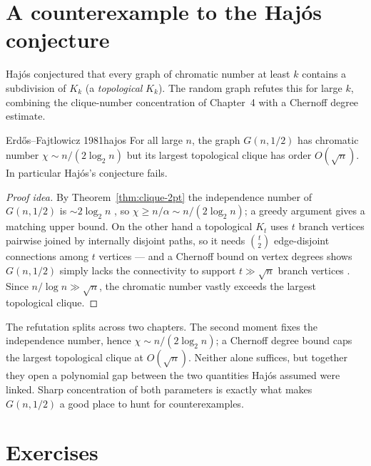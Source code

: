 \section{A counterexample to the Haj\'os conjecture}

Haj\'os conjectured that every graph of chromatic number at least $k$ contains a
subdivision of $K_k$ (a \emph{topological} $K_k$). The random graph refutes this
for large $k$, combining the clique-number concentration of Chapter~4 with a
Chernoff degree estimate.

\begin{theorem}{Erd\H{o}s--Fajtlowicz 1981}{hajos}
For all large $n$, the graph $G(n,1/2)$ has chromatic number
$\chi\sim n/(2\log_2 n)$ but its largest topological clique has order
$O(\sqrt n)$. In particular Haj\'os's conjecture fails.
\end{theorem}

\begin{proof}[Proof idea]
By Theorem~\ref{thm:clique-2pt} the independence number of $G(n,1/2)$ is
$\sim2\log_2 n$ \whp, so $\chi\ge n/\alpha\sim n/(2\log_2 n)$; a greedy argument
gives a matching upper bound. On the other hand a topological $K_t$ uses $t$
branch vertices pairwise joined by internally disjoint paths, so it needs
$\binom t2$ edge-disjoint connections among $t$ vertices --- and a Chernoff bound
on vertex degrees shows $G(n,1/2)$ simply lacks the connectivity to support
$t\gg\sqrt n$ branch vertices \whp. Since $n/\log n\gg\sqrt n$, the chromatic
number vastly exceeds the largest topological clique.
\end{proof}

\begin{insight}
The refutation splits across two chapters. The second moment fixes the
independence number, hence $\chi\sim n/(2\log_2 n)$; a Chernoff degree bound
caps the largest topological clique at $O(\sqrt n)$. Neither alone suffices, but
together they open a polynomial gap between the two quantities Haj\'os assumed
were linked. Sharp concentration of both parameters is exactly what makes
$G(n,1/2)$ a good place to hunt for counterexamples.
\end{insight}

\section*{Exercises}

